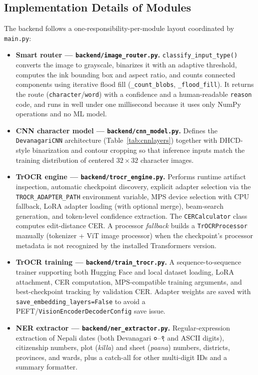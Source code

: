 \documentclass[12pt,a4paper]{report}
\newcommand{\dev}[1]{{\devfont #1}}
\begin{document}
\subsection{Implementation Details of Modules}
The backend follows a one-responsibility-per-module layout coordinated by \texttt{main.py}:

\begin{itemize}[itemsep=2pt]
  \item \textbf{Smart router --- \texttt{backend/image\_router.py}.} \texttt{classify\_input\_type()} converts the image to grayscale, binarizes it with an adaptive threshold, computes the ink bounding box and aspect ratio, and counts connected components using iterative flood fill (\texttt{\_count\_blobs}, \texttt{\_flood\_fill}). It returns the route (\texttt{character}/\texttt{word}) with a confidence and a human-readable \texttt{reason} code, and runs in well under one millisecond because it uses only NumPy operations and no ML model.
  \item \textbf{CNN character model --- \texttt{backend/cnn\_model.py}.} Defines the \texttt{DevanagariCNN} architecture (Table~\ref{tab:cnnlayers}) together with DHCD-style binarization and contour cropping so that inference inputs match the training distribution of centered $32\times32$ character images.
  \item \textbf{TrOCR engine --- \texttt{backend/trocr\_engine.py}.} Performs runtime artifact inspection, automatic checkpoint discovery, explicit adapter selection via the \texttt{TROCR\_ADAPTER\_PATH} environment variable, MPS device selection with CPU fallback, LoRA adapter loading (with optional merge), beam-search generation, and token-level confidence extraction. The \texttt{CERCalculator} class computes edit-distance CER. A processor \textit{fallback} builds a \texttt{TrOCRProcessor} manually (tokenizer + ViT image processor) when the checkpoint's processor metadata is not recognized by the installed Transformers version.
  \item \textbf{TrOCR training --- \texttt{backend/train\_trocr.py}.} A sequence-to-sequence trainer supporting both Hugging Face and local dataset loading, LoRA attachment, CER computation, MPS-compatible training arguments, and best-checkpoint tracking by validation CER. Adapter weights are saved with \texttt{save\_embedding\_layers=False} to avoid a PEFT/\texttt{VisionEncoderDecoderConfig} save issue.
  \item \textbf{NER extractor --- \texttt{backend/ner\_extractor.py}.} Regular-expression extraction of Nepali dates (both Devanagari \dev{०}--\dev{९} and ASCII digits), citizenship numbers, plot (\textit{killa}) and sheet (\textit{paana}) numbers, districts, provinces, and wards, plus a catch-all for other multi-digit IDs and a summary formatter.

\end{itemize}
\end{document}
